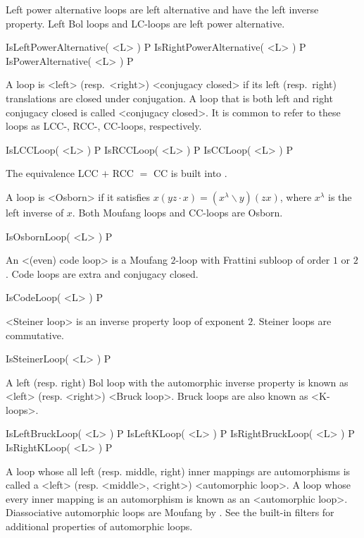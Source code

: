Left power alternative loops are left alternative and have the
left inverse property. Left Bol loops and LC-loops are left power
alternative.

\>IsLeftPowerAlternative( <L> ) P
\>IsRightPowerAlternative( <L> ) P
\>IsPowerAlternative( <L> ) P


\noindent A loop is <left> (resp.\ <right>) <conjugacy closed> if its left (resp.\ right)
translations are closed under conjugation. A loop that is both left and right
conjugacy closed is called <conjugacy closed>. It is common to refer to these loops as
LCC-, RCC-, CC-loops, respectively.

\>IsLCCLoop( <L> ) P
\>IsRCCLoop( <L> ) P
\>IsCCLoop( <L> ) P

The equivalence LCC $+$ RCC $=$ CC is built into {\LOOPS}.

A loop is <Osborn> if it satisfies
$x(yz\cdot x)=(x^\lambda\backslash y)(zx)$, where $x^\lambda$ is the left
inverse of $x$. Both Moufang loops and CC-loops are Osborn.

\>IsOsbornLoop( <L> ) P


An <(even) code loop> is a Moufang $2$-loop
with Frattini subloop of order $1$ or $2$. Code loops are extra and conjugacy
closed.

\>IsCodeLoop( <L> ) P

<Steiner loop> is an inverse property
loop of exponent $2$. Steiner loops are commutative.

\>IsSteinerLoop( <L> ) P

A left (resp. right) Bol loop with the automorphic inverse property is known as
<left> (resp. <right>) <Bruck loop>. Bruck loops are also known as
<K-loops>.

\>IsLeftBruckLoop( <L> ) P
\>IsLeftKLoop( <L> ) P
\>IsRightBruckLoop( <L> ) P
\>IsRightKLoop( <L> ) P

A loop whose all left (resp. middle, right) inner mappings are automorphisms is
called a <left> (resp. <middle>, <right>)
<automorphic loop>. A loop
whose every inner mapping is an automorphism is known as an
<automorphic loop>. Diassociative automorphic loops are Moufang by
\cite{KiKuPh}. See the built-in filters for additional properties of automorphic loops.

